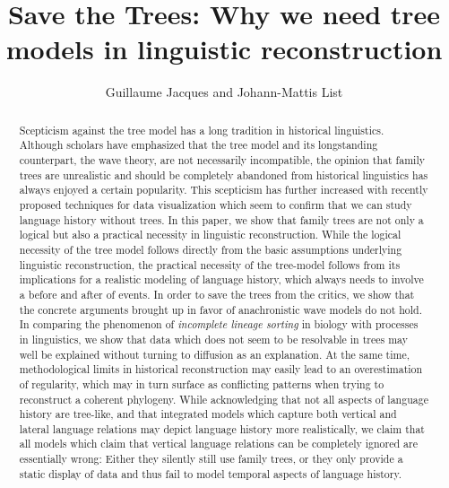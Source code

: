 \documentclass[svgnames,12pt]{scrartcl}
\title{Save the Trees: Why we need tree models in linguistic reconstruction}
\author{Guillaume Jacques and Johann-Mattis List}
\begin{document}
\maketitle
\begin{abstract}
  \small
Scepticism against the tree model has a long tradition in historical linguistics.  Although scholars
have emphasized that the tree model and its longstanding counterpart, the wave theory, are not
necessarily incompatible, the opinion that family trees are unrealistic and should be completely abandoned from
historical linguistics has always enjoyed a certain popularity. This scepticism has further
increased with recently proposed techniques for data visualization which seem to confirm that we can 
study language history without trees.  In this paper, we show that family trees are not only a
logical but also a practical necessity in linguistic reconstruction. While the logical necessity of
the tree model follows directly from the basic assumptions underlying linguistic reconstruction, the
practical necessity of the tree-model follows from its implications for a realistic modeling of
language history, which always needs to involve a before and after of events.  In order to save the
trees from the critics, we show that the concrete arguments brought up in favor of
anachronistic wave models do not hold. In comparing the phenomenon of \emph{incomplete lineage
sorting} in biology with processes in linguistics, we show that data which does not seem to be
resolvable in trees may well be explained without turning to diffusion as an explanation. At the
same time, methodological limits in historical reconstruction may easily lead to an overestimation
of regularity, which may in turn surface as conflicting patterns when trying to reconstruct a
coherent phylogeny. 
  While acknowledging that not all
aspects of language history are tree-like, and that integrated models which capture both vertical
and lateral language relations may depict language history more realistically, we claim that all
models which claim that vertical language relations can be completely ignored are essentially wrong:
Either they silently still use family trees, or they only provide a static display of data and thus
fail to model temporal aspects of language history.
\end{abstract}
\end{document}
